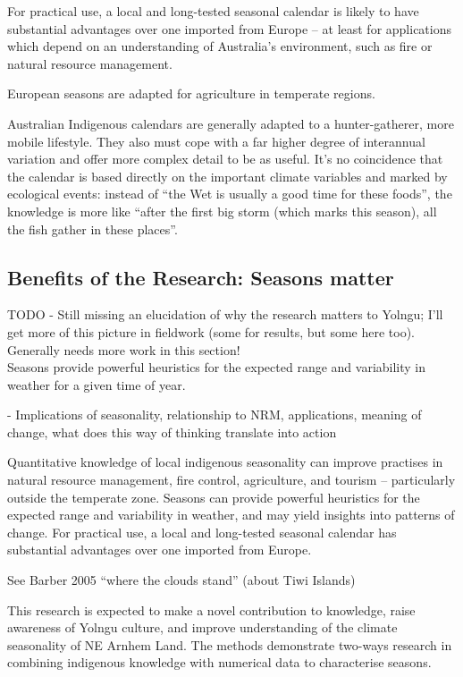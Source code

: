 For practical use, a local and long-tested seasonal calendar is likely to have 
substantial advantages over one imported from Europe – at least for 
applications which depend on an understanding of Australia's environment, such 
as fire or natural resource management.

European seasons are adapted for agriculture in temperate regions.

Australian Indigenous calendars are generally adapted to a hunter-gatherer, 
more mobile lifestyle.  They also must cope with a far higher degree of 
interannual variation and offer more complex detail to be as useful.  It's no 
coincidence that the calendar is based directly on the important climate 
variables and marked by ecological events:  instead of ``the Wet is usually a 
good time for these foods'', the knowledge is more like ``after the first big 
storm (which marks this season), all the fish gather in these places''.



\subsection{Benefits of the Research: Seasons matter}
TODO - Still missing an elucidation of why the research matters to Yolngu; I'll 
get more of this picture in fieldwork (some for results, but some here too).
Generally needs more work in this section!\\

Seasons provide powerful heuristics for the expected range and variability in 
weather for a given time of year.

-	Implications of seasonality, relationship to NRM, applications, meaning of 
change, what does this way of thinking translate into action


Quantitative knowledge of local indigenous seasonality can improve practises in 
natural resource management, fire control, agriculture, and tourism – 
particularly outside the temperate zone.  Seasons can provide powerful 
heuristics for the expected range and variability in weather, and may yield 
insights into patterns of change.  For practical use, a local and long-tested 
seasonal calendar has substantial advantages over one imported from Europe.


See Barber 2005 ``where the clouds stand'' (about Tiwi Islands)

This research is expected to make a novel contribution to knowledge, raise 
awareness of Yolngu culture, and improve understanding of the climate 
seasonality of NE Arnhem Land.  The methods demonstrate two-ways research in 
combining indigenous knowledge with numerical data to characterise seasons.

